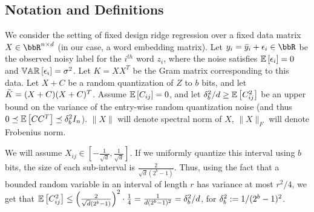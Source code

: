 \documentclass[12pt]{article}
\begin{document}

%


\subsection{Notation and Definitions}
We consider the setting of fixed design ridge regression over a fixed data matrix $X \in \RR^{n\times d}$ (in our case, a word embedding matrix). Let $y_i = \by_i + \eps_i \in \RR$ be the observed noisy label for the $i^{th}$ word $z_i$, where the noise satisfies $\expect{}{\eps_i} = 0$ and $\var{}{\eps_i} = \sigma^2$.  Let $K = XX^T$ be the Gram matrix corresponding to this data.  Let $X+C$ be a random quantization of $Z$ to $b$ bits, and let $\tK = (X+C)(X+C)^T$. Assume $\expect{}{C_{ij}} = 0$, and let $\delta_b^2/d \geq \expect{}{C_{ij}^2}$ be an upper bound on the variance of the entry-wise random quantization noise (and thus $0 \preceq \expect{}{CC^T} \preceq \delta_b^2 I_n$).  $\|X\|$ will denote spectral norm of $X$, $\|X\|_F$ will denote Frobenius norm.

We will assume $X_{ij} \in [-\frac{1}{\sqrt{d}},\frac{1}{\sqrt{d}}]$.  If we uniformly quantize this interval using $b$ bits, the size of each sub-interval is $\frac{2}{\sqrt{d}(2^b-1)}$.  Thus, using the fact that a bounded random variable in an interval of length $r$ has variance at most $r^2/4$, we get that $\expect{}{C_{ij}^2} \leq \Big(\frac{2}{\sqrt{d}(2^b-1)}\Big)^2\cdot \frac{1}{4} = \frac{1}{d(2^b-1)^2} = \delta_b^2/d$, for $\delta_b^2 \defeq 1/(2^b-1)^2$.

 
%

\end{document}
